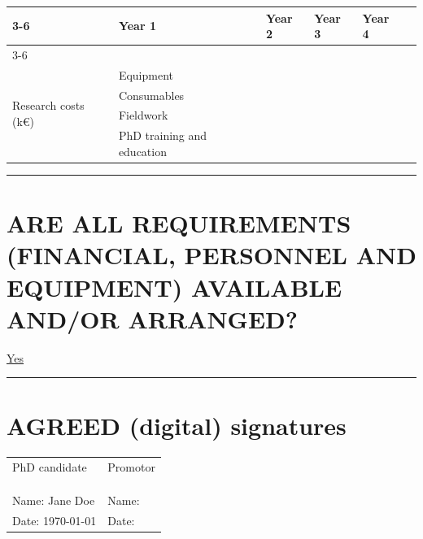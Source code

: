 \documentclass{article}
\begin{document}
\begin{table}[H]
    \centering
    \begin{tabularx}{\textwidth}{|l|X|X|X|X|X|}
        \cline{3-6}
        \multicolumn{2}{l|}{}& Year 1 & Year 2 & Year 3 & Year 4   \\
        \cline{3-6}
        \hline
        \multicolumn{2}{|l|}{Personnel (k€)} &  &        &        &          \\
        \hline
        \multirow{4}{*}{Research costs (k€)} & Equipment  &        &        &        & \\
        \cline{2-6} & Consumables  &        &        &        & \\
        \cline{2-6} & Fieldwork    &        &        &        & \\
        \cline{2-6} & PhD training and education &        &        &        & \\
        \hline
    \end{tabularx}
\end{table}

\begin{center}
    \rule{\textwidth}{0.5pt}
\end{center}

\section{ARE ALL REQUIREMENTS (FINANCIAL, PERSONNEL AND EQUIPMENT) AVAILABLE AND/OR ARRANGED?}

\underline{Yes}


\begin{center}
    \rule{\textwidth}{0.5pt}
\end{center}

\section{AGREED (digital) signatures}

\begin{table}[H]
    \centering
    \begin{tabularx}{\textwidth}{X X}
        PhD candidate                   & Promotor \\
                                        &          \\
                                        &          \\
                                        &          \\
        Name: Jane Doe & Name:    \\
        Date:   \today                   & Date:    \\
    \end{tabularx}
\end{table}
\end{document}
